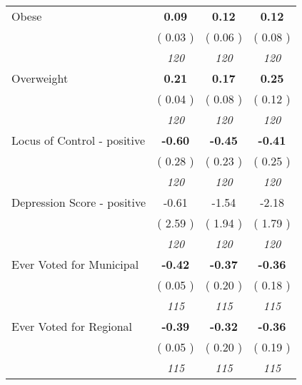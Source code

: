 \begin{tabular}{l c c c}
Obese & \textbf{      0.09 } & \textbf{      0.12 } & \textbf{      0.12 } \\
& (     0.03 ) & (     0.06 ) & (     0.08 ) \\
& \textit{ 120 } & \textit{ 120 } & \textit{ 120 } \\
Overweight & \textbf{      0.21 } & \textbf{      0.17 } & \textbf{      0.25 } \\
& (     0.04 ) & (     0.08 ) & (     0.12 ) \\
& \textit{ 120 } & \textit{ 120 } & \textit{ 120 } \\
Locus of Control - positive & \textbf{     -0.60 } & \textbf{     -0.45 } & \textbf{     -0.41 } \\
& (     0.28 ) & (     0.23 ) & (     0.25 ) \\
& \textit{ 120 } & \textit{ 120 } & \textit{ 120 } \\
Depression Score - positive &     -0.61 &     -1.54 &     -2.18 \\
& (     2.59 ) & (     1.94 ) & (     1.79 ) \\
& \textit{ 120 } & \textit{ 120 } & \textit{ 120 } \\
Ever Voted for Municipal & \textbf{     -0.42 } & \textbf{     -0.37 } & \textbf{     -0.36 } \\
& (     0.05 ) & (     0.20 ) & (     0.18 ) \\
& \textit{ 115 } & \textit{ 115 } & \textit{ 115 } \\
Ever Voted for Regional & \textbf{     -0.39 } & \textbf{     -0.32 } & \textbf{     -0.36 } \\
& (     0.05 ) & (     0.20 ) & (     0.19 ) \\
& \textit{ 115 } & \textit{ 115 } & \textit{ 115 } \\
\bottomrule
\end{tabular}
